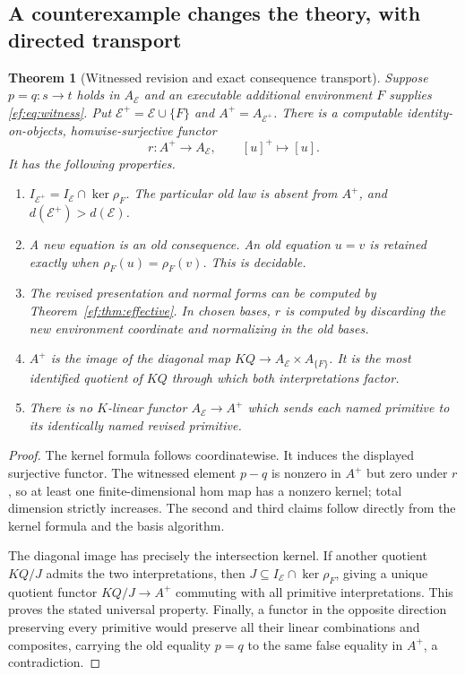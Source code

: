 \documentclass[11pt]{article}
\newtheorem{theorem}{Theorem}[section]
\theoremstyle{definition}
\theoremstyle{remark}\newtheorem{remark}[theorem]{Remark}
\begin{document}
\subsection{A counterexample changes the theory, with directed transport}

\begin{theorem}[Witnessed revision and exact consequence transport]
\label{ef:thm:revision}
Suppose $p=q:s\to t$ holds in $A_{\mathcal E}$ and an executable
additional environment $F$ supplies \eqref{ef:eq:witness}.
Put $\mathcal E^+=\mathcal E\cup\{F\}$ and $A^+=A_{\mathcal E^+}$.
There is a computable identity-on-objects, homwise-surjective functor
\begin{equation}\label{ef:eq:revision-map}
            r:A^+\longrightarrow A_{\mathcal E},\qquad [u]^+\longmapsto[u].
\end{equation}
It has the following properties.
\begin{enumerate}
\item $I_{\mathcal E^+}=I_{\mathcal E}\cap\ker\rho_F$.
      The particular old law is absent from $A^+$, and
      $d(\mathcal E^+)>d(\mathcal E)$.
\item A new equation is an old consequence. An old equation $u=v$ is
      retained exactly when $\rho_F(u)=\rho_F(v)$. This is decidable.
\item The revised presentation and normal forms can be computed by
      Theorem~\ref{ef:thm:effective}. In chosen bases, $r$ is computed by
      discarding the new environment coordinate and normalizing in the
      old bases.
\item $A^+$ is the image of the diagonal map
      $KQ\to A_{\mathcal E}\times A_{\{F\}}$. It is the most identified
      quotient of $KQ$ through which both interpretations factor.
\item There is no $K$-linear functor $A_{\mathcal E}\to A^+$ which sends
      each named primitive to its identically named revised primitive.
\end{enumerate}
\end{theorem}
\begin{proof}
The kernel formula follows coordinatewise. It induces the displayed
surjective functor. The witnessed element $p-q$ is nonzero in $A^+$ but
zero under $r$, so at least one finite-dimensional hom map has a
nonzero kernel; total dimension strictly increases. The second and third
claims follow directly from the kernel formula and the basis algorithm.

The diagonal image has precisely the intersection kernel. If another
quotient $KQ/J$ admits the two interpretations, then
$J\subseteq I_{\mathcal E}\cap\ker\rho_F$, giving a unique quotient
functor $KQ/J\to A^+$ commuting with all primitive interpretations.
This proves the stated universal property. Finally, a functor in the
opposite direction preserving every primitive would preserve all their
linear combinations and composites, carrying the old equality $p=q$
to the same false equality in $A^+$, a contradiction.
\end{proof}
\end{document}
